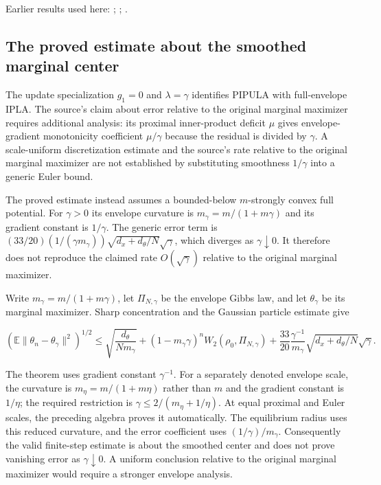 \documentclass[11pt,a4paper]{report}
\begin{document}
Earlier results used here: \cite[Section~3.1.1]{LangevinLean2026IPLA}; \cite[Section~3.3.3]{LangevinLean2026IPLA}; \cite[Section~3.4.3]{LangevinLean2026IPLA}.
\subsection{\texorpdfstring{The proved estimate about the smoothed marginal center}{The proved estimate about the smoothed marginal center}}
\label{report-step-ProximalLangevin-PIPULA-lean-3}


The update specialization \(g_1=0\) and \(\lambda=\gamma\) identifies PIPULA with full-envelope IPLA. The source’s claim about error relative to the original marginal maximizer requires additional analysis: its proximal inner-product deficit \(\mu\) gives envelope-gradient monotonicity coefficient \(\mu/\gamma\) because the residual is divided by \(\gamma\). A scale-uniform discretization estimate and the source’s rate relative to the original marginal maximizer are not established by substituting smoothness \(1/\gamma\) into a generic Euler bound.



The proved estimate instead assumes a bounded-below \(m\)-strongly convex full potential. For \(\gamma>0\) its envelope curvature is \(m_\gamma=m/(1+m\gamma)\) and its gradient constant is \(1/\gamma\). The generic error term is \((33/20)(1/(\gamma m_\gamma))\sqrt{d_x+d_\theta/N}\sqrt\gamma\), which diverges as \(\gamma\downarrow0\). It therefore does not reproduce the claimed rate \(O(\sqrt\gamma)\) relative to the original marginal maximizer.



Write \(m_\gamma=m/(1+m\gamma)\), let \(\Pi_{N,\gamma}\) be the envelope Gibbs law, and let \(\theta_\gamma\) be its marginal maximizer. Sharp concentration and the Gaussian particle estimate give

\[\left(\mathbb E\|\theta_n-\theta_\gamma\|^2\right)^{1/2}\le\sqrt{\frac{d_\theta}{Nm_\gamma}}+(1-m_\gamma\gamma)^nW_2(\rho_0,\Pi_{N,\gamma})+\frac{33}{20}\frac{\gamma^{-1}}{m_\gamma}\sqrt{d_x+d_\theta/N}\sqrt\gamma.\]

The theorem uses gradient constant \(\gamma^{-1}\). For a separately denoted envelope scale, the curvature is \(m_\eta=m/(1+m\eta)\) rather than \(m\) and the gradient constant is \(1/\eta\); the required restriction is \(\gamma\le2/(m_\eta+1/\eta)\). At equal proximal and Euler scales, the preceding algebra proves it automatically. The equilibrium radius uses this reduced curvature, and the error coefficient uses \((1/\gamma)/m_\gamma\). Consequently the valid finite-step estimate is about the smoothed center and does not prove vanishing error as \(\gamma\downarrow0\). A uniform conclusion relative to the original marginal maximizer would require a stronger envelope analysis.
\end{document}
